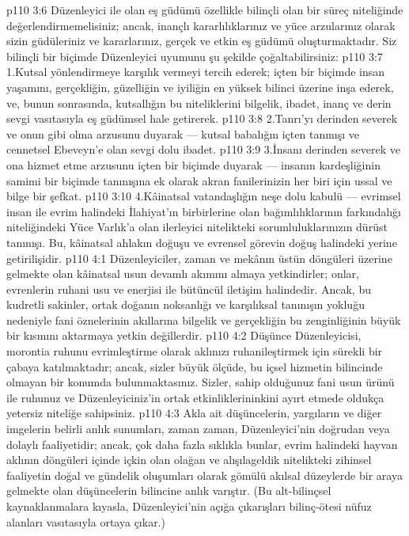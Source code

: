 \vs p110 3:6 Düzenleyici ile olan eş güdümü özellikle bilinçli olan bir süreç niteliğinde değerlendirmemelisiniz; ancak, inançlı kararlılıklarınız ve yüce arzularınız olarak sizin güdüleriniz ve kararlarınız, gerçek ve etkin eş güdümü oluşturmaktadır. Siz bilinçli bir biçimde Düzenleyici uyumunu şu şekilde çoğaltabilirsiniz:
\vs p110 3:7 1.\bibnobreakspace Kutsal yönlendirmeye karşılık vermeyi tercih ederek; içten bir biçimde insan yaşamını, gerçekliğin, güzelliğin ve iyiliğin en yüksek bilinci üzerine inşa ederek, ve, bunun sonrasında, kutsallığın bu niteliklerini bilgelik, ibadet, inanç ve derin sevgi vasıtasıyla eş güdümsel hale getirerek.
\vs p110 3:8 2.\bibnobreakspace Tanrı’yı derinden severek ve onun gibi olma arzusunu duyarak --- kutsal babalığın içten tanınışı ve cennetsel Ebeveyn’e olan sevgi dolu ibadet.
\vs p110 3:9 3.\bibnobreakspace İnsanı derinden severek ve ona hizmet etme arzusunu içten bir biçimde duyarak --- insanın kardeşliğinin samimi bir biçimde tanınışına ek olarak akran fanilerinizin her biri için ussal ve bilge bir şefkat.
\vs p110 3:10 4.\bibnobreakspace Kâinatsal vatandaşlığın neşe dolu kabulü --- evrimsel insan ile evrim halindeki İlahiyat’ın birbirlerine olan bağımlılıklarının farkındalığı niteliğindeki Yüce Varlık’a olan ilerleyici nitelikteki sorumluluklarınızın dürüst tanınışı. Bu, kâinatsal ahlakın doğuşu ve evrensel görevin doğuş halindeki yerine getirilişidir.
\vs p110 4:1 Düzenleyiciler, zaman ve mekânın üstün döngüleri üzerine gelmekte olan kâinatsal usun devamlı akımını almaya yetkindirler; onlar, evrenlerin ruhani usu ve enerjisi ile bütüncül iletişim halindedir. Ancak, bu kudretli sakinler, ortak doğanın noksanlığı ve karşılıksal tanınışın yokluğu nedeniyle fani öznelerinin akıllarına bilgelik ve gerçekliğin bu zenginliğinin büyük bir kısmını aktarmaya yetkin değillerdir.
\vs p110 4:2 Düşünce Düzenleyicisi, morontia ruhunu evrimleştirme olarak aklınızı ruhanileştirmek için sürekli bir çabaya katılmaktadır; ancak, sizler büyük ölçüde, bu içsel hizmetin bilincinde olmayan bir konumda bulunmaktasınız. Sizler, sahip olduğunuz fani usun ürünü ile ruhunuz ve Düzenleyiciniz’in ortak etkinliklerininkini ayırt etmede oldukça yetersiz niteliğe sahipsiniz.
\vs p110 4:3 Akla ait düşüncelerin, yargıların ve diğer imgelerin belirli anlık sunumları, zaman zaman, Düzenleyici’nin doğrudan veya dolaylı faaliyetidir; ancak, çok daha fazla sıklıkla bunlar, evrim halindeki hayvan aklının döngüleri içinde içkin olan olağan ve alışılageldik nitelikteki zihinsel faaliyetin doğal ve gündelik oluşumları olarak gömülü akılsal düzeylerde bir araya gelmekte olan düşüncelerin bilincine anlık varıştır. (Bu alt\hyp{}bilinçsel kaynaklanmalara kıyasla, Düzenleyici’nin açığa çıkarışları bilinç\hyp{}ötesi nüfuz alanları vasıtasıyla ortaya çıkar.)
